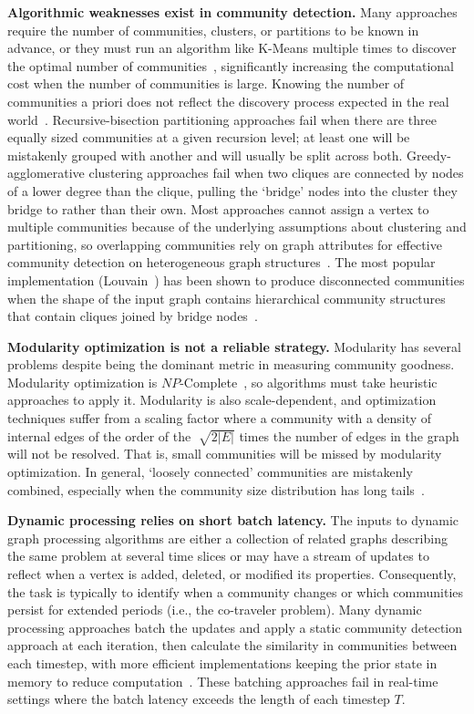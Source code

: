 \textbf{Algorithmic weaknesses exist in community detection.}
Many approaches require the number of communities, clusters, or partitions to be known in advance, or they must run an algorithm like K-Means multiple times to discover the optimal number of communities~\cite{Kernighan1970, Reichardt2004, Ng2001, White2005, Yang2016, Wang2017}, significantly increasing the computational cost when the number of communities is large. 
Knowing the number of communities a priori does not reflect the discovery process expected in the real world~\cite{Regli2022a}.
Recursive-bisection partitioning approaches fail when there are three equally sized communities at a given recursion level; at least one will be mistakenly grouped with another and will usually be split across both. 
Greedy-agglomerative clustering approaches fail when two cliques are connected by nodes of a lower degree than the clique, pulling the `bridge' nodes into the cluster they bridge to rather than their own. 
Most approaches cannot assign a vertex to multiple communities because of the underlying assumptions about clustering and partitioning, so overlapping communities rely on graph attributes for effective community detection on heterogeneous graph structures~\cite{Reichardt2006}.
The most popular implementation (Louvain~\cite{Blondel2008}) has been shown to produce disconnected communities when the shape of the input graph contains hierarchical community structures that contain cliques joined by bridge nodes~\cite{Traag2019}.

\textbf{Modularity optimization is not a reliable strategy.}
Modularity has several problems despite being the dominant metric in measuring community goodness. 
Modularity optimization is $NP$-Complete~\cite{Brandes2006}, so algorithms must take heuristic approaches to apply it. 
Modularity is also scale-dependent, and optimization techniques suffer from a scaling factor where a community with a density of internal edges of the order of the $\sqrt[]{2|E|}$ times the number of edges in the graph will not be resolved.
That is, small communities will be missed by modularity optimization.
In general, `loosely connected' communities are mistakenly combined, especially when the community size distribution has long tails~\cite{Fortunato2007}.

\textbf{Dynamic processing relies on short batch latency.} 
The inputs to dynamic graph processing algorithms are either a collection of related graphs describing the same problem at several time slices or may have a stream of updates to reflect when a vertex is added, deleted, or modified its properties.
Consequently, the task is typically to identify when a community changes or which communities persist for extended periods (i.e., the co-traveler problem).
Many dynamic processing approaches batch the updates and apply a static community detection approach at each iteration, then calculate the similarity in communities between each timestep, with more efficient implementations keeping the prior state in memory to reduce computation~\cite{Rossetti2018}.
These batching approaches fail in real-time settings where the batch latency exceeds the length of each timestep $T$.

